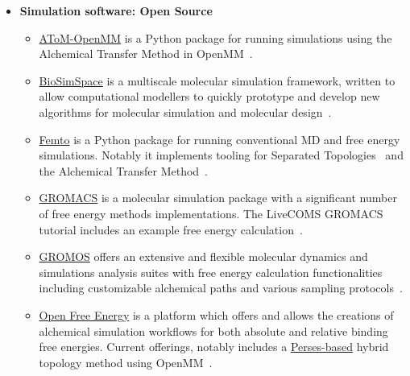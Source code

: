 \documentclass[9pt,bestpractices]{livecoms}
\begin{document}
\begin{itemize}
\begin{itemize}
	\item \href{https://www.charmm.org/}{CHARMM} has a variety of tools developed over the years. The PERT module can be used to define initial and final states and define the intermediate lambda points. FREN and BAR modules can be used to analyse the data after the MD run. Lambda-dynamics-based free energy calculation can be carried out using the BLOCK module. GPU optimized implementation of CHARMM's lambda dynamics is also implemented in the new package BLaDE~\cite{hayes2021blade}. A number of energy interpolation schemes have been implemented in the new GPU package apoCHARMM~\cite{prasad2025apocharmm}.
	\end{itemize}
\item [] \textbf{Simulation software: Open Source}
	\begin{itemize}
    \item \href{https://github.com/Gallicchio-Lab/AToM-OpenMM}{AToM-OpenMM} is a Python package for running simulations using the Alchemical Transfer Method in OpenMM~\cite{azimi2022relative, wu2021alchemical,gallicchio2008,gallicchio2025mutants}.    
    \item \href{https://biosimspace.org/}{BioSimSpace} is a multiscale molecular simulation framework, written to allow computational modellers to quickly prototype and develop new algorithms for molecular simulation and molecular design~\cite{hedges2019biosimspace, hedges2023suite}.
\item \href{https://github.com/Psivant/femto/tree/main}{Femto} is a Python package for running conventional MD and free energy simulations. Notably it implements tooling for Separated Topologies~\cite{baumann2023broadening} and the Alchemical Transfer Method~\cite{azimi2022relative,wu2021alchemical,gallicchio2008,gallicchio2025mutants}.
    \item 	\href{http://www.gromacs.org/}{GROMACS} is a molecular simulation package with a significant number of free energy methods implementations. The LiveCOMS GROMACS tutorial includes an example free energy calculation~\cite{lemkul2018From}.
	\item \href{http://www.gromos.net/}{GROMOS} offers an extensive and flexible molecular dynamics and simulations analysis suites with free energy calculation functionalities including customizable alchemical paths and various sampling protocols~\cite{schmid2012architecture, kunz2012new, eichenberger2011gromos}.
    \item     \href{https://openfree.energy/}{Open Free Energy} is a platform which offers and allows the creations of alchemical simulation workflows for both absolute and relative binding free energies. Current offerings, notably includes a \href{https://github.com/choderalab/perses/tree/main/perses}{Perses-based} hybrid topology method using OpenMM~\cite{alibay_2025_17258732}.

\end{itemize}
\end{itemize}
\end{document}
